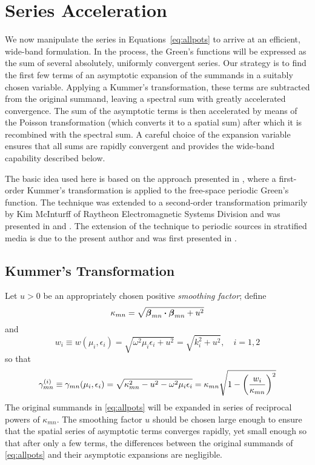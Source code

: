 \section{Series Acceleration}
We now manipulate the series in Equations~\eqref{eq:allpots} to
arrive at an efficient, 
wide-band formulation.  In the process, the Green's functions will be
expressed as the sum of several absolutely, uniformly convergent
series.  Our strategy is to find the first few terms of an asymptotic
expansion of the summands in a suitably chosen variable.  Applying a Kummer's
transformation, these terms are
subtracted from the original summand, leaving a spectral sum with greatly
accelerated convergence.  The sum of the asymptotic terms is then
accelerated by means of the Poisson transformation (which converts it to a
spatial sum) after which it is recombined
with the spectral sum.  A careful choice of the expansion variable ensures
that all sums are rapidly convergent and  provides
the wide-band capability described below.

The basic idea used here is based on the approach presented in \cite{srzw:90}, where a first-order Kummer's
transformation is applied to the free-space periodic Green's function. 
The technique was extended to a second-order transformation primarily by Kim McInturff of Raytheon Electromagnetic
Systems Division and was presented in \cite{smjj:91} and \cite{smjs:92}.
The extension of the technique to periodic sources
in stratified media is due to the present author and was first presented in \cite{simo:01b}.


\subsection{Kummer's Transformation}
Let $u>0$ 
be an appropriately chosen positive {\em smoothing factor}; define
\begin{equation}
  \kappa_{mn}  =  \sqrt{\boldsymbol{\beta}_{mn} \boldsymbol{\cdot} \boldsymbol{\beta}_{mn} +u^2}
         \label{eq:kappa}
\end{equation}
and
\begin{equation}
  w_i  \equiv w(\mu_i,\epsilon_i) =  
  \sqrt{\omega^2\mu_i\epsilon_i + u^2} =
  \sqrt{k_i^2+u^2}, \quad i=1,2 \label{eq:w}
\end{equation}
so that 
\begin{equation}
  \gamma^{(i)}_{mn} 
  \equiv \gamma_{mn} (\mu_i,\epsilon_i)
  = \sqrt{\kappa_{mn}^2 - u^2 - \omega^2\mu_i\epsilon_i}
  = \kappa_{mn} \sqrt{1 - \left(\frac{w_i}{\kappa_{mn}}\right)^2}
\end{equation}
The original summands in \eqref{eq:allpots} will be expanded in series of reciprocal 
powers
of $\kappa_{mn}$.  The smoothing factor $u$ should be chosen large enough to ensure that the 
spatial series of asymptotic terms converges rapidly, yet small
enough so that after only a few terms, the differences between the original summands
of \eqref{eq:allpots} and their asymptotic expansions are negligible. 


